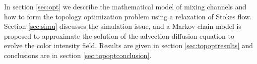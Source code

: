 

In section \ref{sec:opt} we describe the mathematical model of mixing
channels and how to form the topology optimization problem using a
relaxation of Stokes flow. Section \ref{sec:simu} discusses the
simulation issue, and a Markov chain model is proposed to approximate
the solution of the advection-diffusion equation to evolve the color
intensity field. Results are given in section \ref{sec:topoptresults} and 
conclusions are in section \ref{sec:topoptconclusion}.
